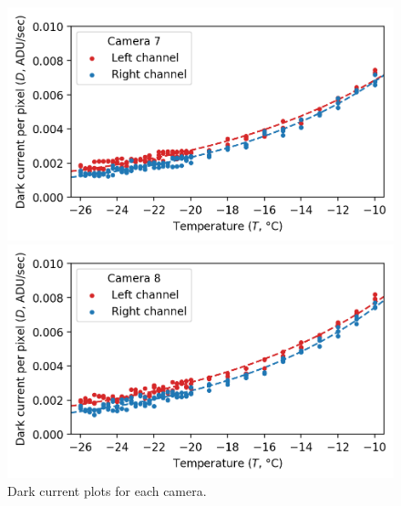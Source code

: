 \begin{colsection}
\begin{figure}[p]
\begin{center}
        \begin{minipage}[t]{0.49\linewidth}\vspace{10pt}
            \includegraphics[width=\linewidth]{images/detectors/dc_7.png}
        \end{minipage}
        \begin{minipage}[t]{0.49\linewidth}\vspace{10pt}
            \includegraphics[width=\linewidth]{images/detectors/dc_8.png}
        \end{minipage}
    \end{center}
    \caption[Dark current plots]{
        Dark current plots for each camera.
    }\label{fig:dcs}
\end{figure}

\clearpage
\newpage

\end{colsection}


